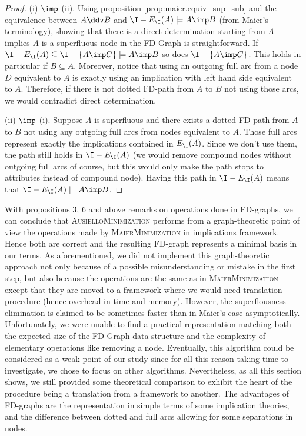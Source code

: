 \begin{proof} (i) $\imp$ (ii). Using proposition
\ref{prop:maier.equiv_sup_sub} and the equivalence between $A \ddv B$
and $\I - E_{\I}(A) \models A \imp B$ (from Maier's terminology), showing that there is a direct determination starting from $A$ implies $A$ is a superfluous node in the FD-Graph is straightforward. If $\I - E_{\I}(A) \subseteq \I - \{A \imp C \} \models A \imp B$ so does $\I - \{A \imp C \}$. This holds in particular if $B \subseteq A$. Moreover, notice that using an outgoing full arc from a node $D$ equivalent to $A$ is exactly using an implication with left hand side equivalent to $A$. Therefore, if there is not dotted FD-path from $A$ to $B$ not using those arcs, we would contradict direct determination.

\vspace{1.2em}

(ii) $\imp$ (i). Suppose $A$ is superfluous and there exists a dotted FD-path from $A$ to $B$ not using any outgoing full arcs from nodes equivalent to $A$. Those full arcs represent exactly the implications contained in $E_{\I}(A)$. Since we don't use them, the path still holds in $\I - E_{\I}(A)$ (we would remove compound nodes without outgoing full arcs of course, but this would only make the path stops to attributes instead of compound node). Having this path in $\I - E_{\I}(A)$ means that $\I - E_{\I}(A) \models A \imp B$.
	
\end{proof}

With propositions 3, 6 and above remarks on operations done in FD-graphs, we
can conclude that \textsc{AusielloMinimization} performs from a graph-theoretic point of view the operations made by \textsc{MaierMinimization} in implications
framework. Hence both are correct and the resulting FD-graph represents a minimal basis in our terms. As aforementioned, we did not implement this graph-theoretic approach not only because of a possible misunderstanding or mistake in the first step, but also because the operations are the same as in
\textsc{MaierMinimization} except that they are moved to a framework where
we would need translation procedure (hence overhead in time and memory). However, the superflousness elimination is claimed to be  sometimes faster than in Maier's case asymptotically. Unfortunately, we were unable to find a 
practical representation matching both the expected size of the FD-Graph data
structure and the complexity of elementary operations like removing a node.
Eventually, this algorithm could be considered as a weak point of our study since for all this reason taking time to investigate, we chose to focus on
other algorithms. Nevertheless, as all this section shows, we still provided
some theoretical comparison to exhibit the heart of the procedure being a 
translation from a framework to another. The advantages of FD-graphs are the
representation in simple terms of some implication theories, and the difference
between dotted and full arcs allowing for some separations in nodes.

